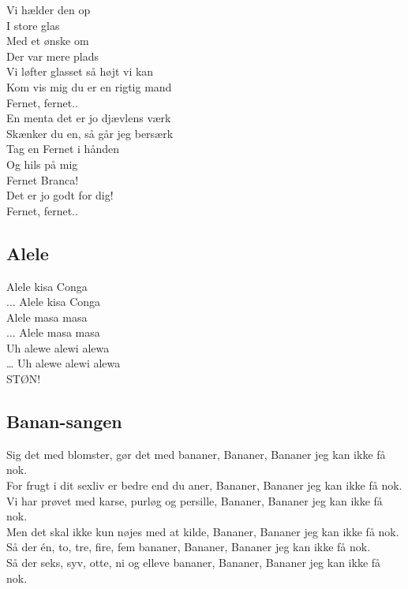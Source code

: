 Vi hælder den op\\
I store glas\\
Med et ønske om\\
Der var mere plads\\
Vi løfter glasset så højt vi kan\\
Kom vis mig du er en rigtig mand\\

Fernet, fernet..\\

En menta det er jo djævlens værk\\
Skænker du en, så går jeg bersærk\\
Tag en Fernet i hånden\\
Og hils på mig\\
Fernet Branca!\\
Det er jo godt for dig!\\

Fernet, fernet..\\

\subsection*{Alele}

Alele kisa Conga\\
... Alele kisa Conga\\
Alele masa masa\\
... Alele masa masa\\
Uh alewe alewi alewa\\
… Uh alewe alewi alewa\\

STØN!\\

\subsection*{Banan-sangen}

Sig det med blomster, gør det med bananer, Bananer, Bananer jeg kan ikke få nok.\\ 
For frugt i dit sexliv er bedre end du aner, Bananer, Bananer jeg kan ikke få nok.\\

Vi har prøvet med karse, purløg og persille, Bananer, Bananer jeg kan ikke få nok.\\ 
Men det skal ikke kun nøjes med at kilde, Bananer, Bananer jeg kan ikke få nok.\\ 

Så der én, to, tre, fire, fem bananer, Bananer, Bananer jeg kan ikke få nok.\\
Så der seks, syv, otte, ni og elleve bananer, Bananer, Bananer jeg kan ikke få nok.\\ 
 

